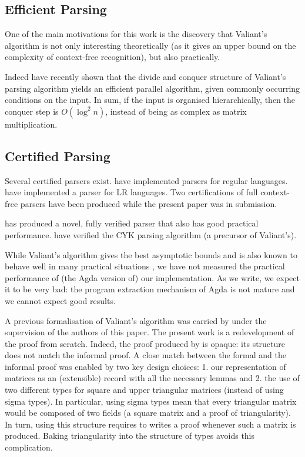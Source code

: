 \documentclass{CSML}
\numberwithin{theorem}{section}
\begin{document}
\subsection{Efficient Parsing}

One of the main motivations for this work is the discovery that
Valiant's algorithm is not only interesting theoretically (as it gives
an upper bound on the complexity of context-free recognition), but
also practically.

Indeed \citet{bernardy_efficient_2013,bernardy_efficient_2015} have
recently shown that the divide and conquer structure of Valiant's
parsing algorithm yields an efficient parallel algorithm, given
commonly occurring conditions on the input. In sum, if the input is
organised hierarchically, then the conquer step is $O(\log^2 n)$,
instead of being as complex as matrix multiplication.

\subsection{Certified Parsing}

Several certified parsers exist.
\citet{firsov_certified_2013,coquand_decision_2011} have implemented
parsers for regular languages.  \citet{jourdan_validating_2012} have
implemented a parser for LR languages. Two certifications of full
context-free parsers have been produced while the present paper was in
submission.

\citet{ridge_simple_2014} has produced a novel, fully verified parser
that also has good practical performance. \citet{firsov_certified_2014} have
verified the CYK parsing algorithm (a precursor of Valiant's).

While Valiant's algorithm gives the best asymptotic bounds and is also
known to behave well in many practical situations
\citep{bernardy_efficient_2015}, we have not measured the practical
performance of (the Agda version of) our implementation.
As we write, we expect it to be very bad: the program extraction
mechanism of Agda is not mature and we cannot expect good results.

A previous formalisation of Valiant's algorithm was carried by
\citet{bth_sjblom_agda_2013} under the supervision of the authors of
this paper.  The present work is a redevelopment of the proof from
scratch. Indeed, the proof produced by
\citeauthor{bth_sjblom_agda_2013} is opaque: its structure does not
match the informal proof.  A close match between the formal and the
informal proof was enabled by two key design choices:
1. our representation of matrices as an (extensible) record with all
the necessary lemmas and
2. the use of two different types for square and upper triangular
matrices (instead of using sigma types).
In particular, using sigma types mean that every triangular matrix
would be composed of two fields (a square matrix and a proof of
triangularity).
In turn, using this structure requires to writes a proof whenever such
a matrix is produced.
Baking triangularity into the structure of types avoids this
complication.
\end{document}
